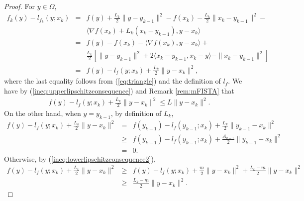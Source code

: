 \documentclass[11pt]{article}
\begin{document}
\begin{proof}
For $y \in \Omega$, 
\begin{eqnarray*}
f_{k}(y) - l_{f_{k}}(y; x_k) & = & f(y) + \frac{L_k}{2}\|y - y_{k-1} \|^2 - f(x_k) - \frac{L_k}{2} \|x_k - y_{k-1}\|^2 - \\
&  & \langle \nabla f(x_k) + L_k (x_k - y_{k-1}), y - x_k \rangle \\
& = & f(y) - f(x_k) - \langle \nabla f(x_k), y - x_k \rangle + \\
&    & \frac{L_k}{2} [\| y - y_{k-1} \|^2 + 2 \langle x_k - y_{k-1}, x_k - y \rangle - \| x_k - y_{k-1} \|^2] \\
& = & f(y) - l_f(y;x_k) + \frac{L_k}{2} \| y - x_k \|^2,
\end{eqnarray*}
where the last equality follows from (\ref{eq:triangle}) and the definition of $l_f$.  We have by (\ref{ineq:upperlipschitzconsequence}) and Remark \ref{rem:mFISTA} that
\begin{eqnarray*}
 f(y) - l_f(y;x_k) + \frac{L_k}{2} \| y - x_k \|^2 \leq L \| y - x_k\|^2.
 \end{eqnarray*}
On the other hand, when $y = y_{k-1}$, by definition of $L_k$,
 \begin{eqnarray*}
f(y) - l_f(y;x_k) + \frac{L_k}{2} \| y - x_k \|^2 & = &  f(y_{k-1}) - l_f(y_{k-1};x_k) + \frac{L_k}{2} \| y_{k-1} - x_k \|^2 \\
& \geq &   f(y_{k-1}) - l_f(y_{k-1};x_k) +\frac{A_{k-1}}{2} \| y_{k-1} - x_k \|^2 \\
& = &  0.
 \end{eqnarray*} 
Otherwise, by (\ref{ineq:lowerlipschitzconsequence2}),
 \begin{eqnarray*}
f(y) - l_f(y;x_k) + \frac{L_k}{2} \| y - x_k \|^2  & \geq &   f(y) - l_f(y;x_k) + \frac{\underline{m}}{2} \| y - x_k \|^2 + \frac{L_k - \underline{m}}{2} \| y - x_k \|^2 \\
& \geq &  \frac{L_k - \underline{m}}{2} \| y - x_k \|^2 .
 \end{eqnarray*} 
\end{proof}
\end{document}
